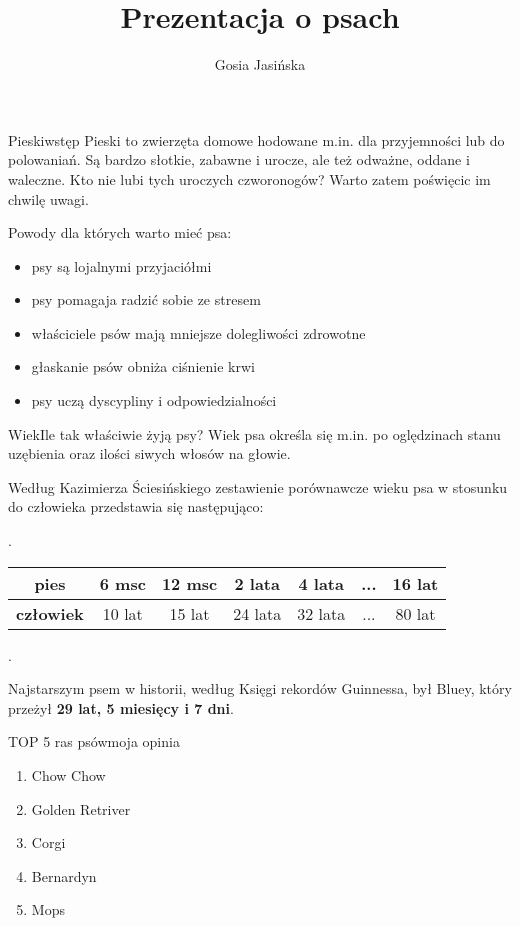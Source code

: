 \documentclass{beamer}
\title{Prezentacja o psach}
\author{Gosia Jasińska}
\institute{UG}
\begin{document}
	\maketitle
	\begin{frame}{Pieski}{wstęp}
		Pieski to zwierzęta domowe hodowane m.in. dla przyjemności lub do polowaniań.
		Są bardzo słotkie, zabawne i urocze, ale też odważne, oddane i waleczne.
		Kto nie lubi tych uroczych czworonogów?
		Warto zatem poświęcic im chwilę uwagi.
	\end{frame}
	\begin{frame}{Powody dla których warto mieć psa:}
		\begin{itemize}
			\item psy są lojalnymi przyjaciółmi \pause
			\item psy pomagaja radzić sobie ze stresem \pause
			\item właściciele psów mają mniejsze dolegliwości zdrowotne \pause
			\item głaskanie psów obniża ciśnienie krwi \pause
			\item psy uczą dyscypliny i odpowiedzialności
		\end{itemize}
	\end{frame}
	\begin{frame}{Wiek}{Ile tak właściwie żyją psy?}
		Wiek psa określa się m.in. po oględzinach stanu uzębienia oraz ilości siwych włosów na głowie.   
		   
		Według Kazimierza Ściesińskiego zestawienie porównawcze wieku psa w stosunku do człowieka przedstawia się następująco: 
		
		.
		
			\begin{tabular}{c| |c|c|c|c|c|c}
				\textbf{pies} & 6 msc & 12 msc & 2 lata & 4 lata & ... & 16 lat \\
				\hline
				\textbf{człowiek} & 10 lat & 15 lat & 24 lata & 32 lata & ... & 80 lat \\
			\end{tabular}
		
		.
		
		Najstarszym psem w historii, według Księgi rekordów Guinnessa, był Bluey, który przeżył \textbf{29 lat, 5 miesięcy i 7 dni}.
	\end{frame}
		\begin{frame}{TOP 5 ras psów}{moja opinia}
		\begin{enumerate}
			\item Chow Chow \pause
			\item Golden Retriver \pause
			\item Corgi \pause
			\item Bernardyn \pause
			\item Mops
		\end{enumerate}
	\end{frame}
\end{document}
